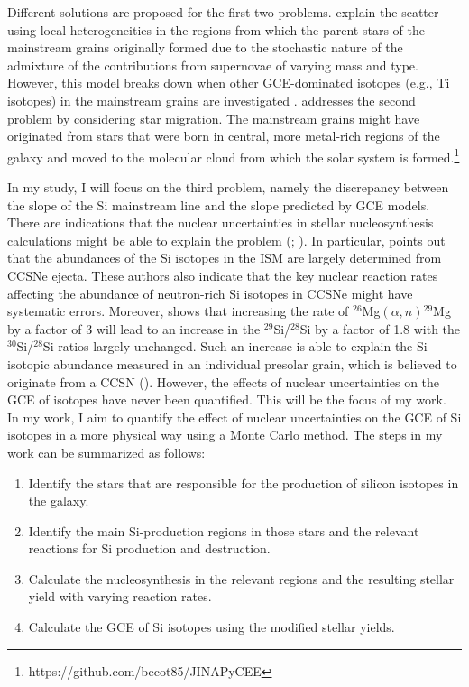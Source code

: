 \documentclass{brandeis-thesis3.2}
\newcommand{\iso}[2]{$^{#1}${#2}}
\begin{document}
Different solutions are proposed for the first two problems. \cite{Lugaro1999} explain the scatter using local heterogeneities in the regions from which the parent stars of the mainstream grains originally formed due to the stochastic nature of the admixture of the contributions from supernovae of varying mass and type. However, this model breaks down when other GCE-dominated isotopes (e.g., Ti isotopes) in the mainstream grains are investigated \citep{Nittler_2005}. \cite{Clayton1997} addresses the second problem by considering star migration. The mainstream grains might have originated from stars that were born in central, more metal-rich regions of the galaxy and moved to the molecular cloud from which the solar system is formed.\footnote[1]{https://github.com/becot85/JINAPyCEE}

In my study, I will focus on the third problem, namely the discrepancy between the slope of the Si mainstream line and the slope predicted by GCE models. There are indications that the nuclear uncertainties in stellar nucleosynthesis calculations might be able to explain the problem (\citealt{Timmes_1996}; \citealt{Hoppe_2009}). In particular, \cite{Timmes_1996} points out that the abundances of the Si isotopes in the ISM are largely determined from CCSNe ejecta. These authors also indicate that the key nuclear reaction rates affecting the abundance of neutron-rich Si isotopes in CCSNe might have systematic errors. Moreover, \cite{Hoppe_2009} shows that increasing the rate of \iso{26}{Mg}$(\alpha, n)$\iso{29}{Mg} by a factor of 3 will lead to an increase in the \iso{29}{Si}/\iso{28}{Si} by a factor of 1.8 with the \iso{30}{Si}/\iso{28}{Si} ratios largely unchanged. Such an increase is able to explain the Si isotopic abundance measured in an individual presolar grain, which is believed to originate from a CCSN (\citealt{Hoppe_2009}). However, the effects of nuclear uncertainties on the GCE of isotopes have never been quantified. This will be the focus of my work. In my work, I aim to quantify the effect of nuclear uncertainties on the GCE of Si isotopes in a more physical way using a Monte Carlo method. The steps in my work can be summarized as follows:
\begin{enumerate}
    \item Identify the stars that are responsible for the production of silicon isotopes in the galaxy.
    \item Identify the main Si-production regions in those stars and the relevant reactions for Si production and destruction.
    \item Calculate the nucleosynthesis in the relevant regions and the resulting stellar yield with varying reaction rates.
    \item Calculate the GCE of Si isotopes using the modified stellar yields.
\end{enumerate}
\end{document}
